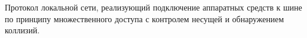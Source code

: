 Протокол локальной сети, реализующий подключение
аппаратных средств к шине по принципу множественного доступа
с контролем несущей и обнаружением коллизий.
